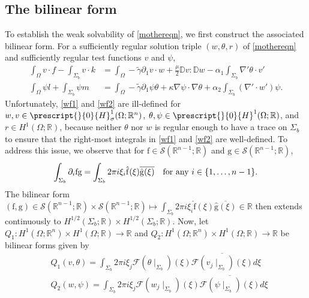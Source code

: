 \documentclass[11pt,letterpaper,reqno]{amsart}
\numberwithin{equation}{section}
\begin{document}
\subsection{The bilinear form} \label{blform}

To establish the weak solvability of \eqref{mothereqn}, we first construct the associated bilinear form. For a sufficiently regular solution triple \((w, \theta, r)\) of \eqref{mothereqn} and sufficiently regular test functions \(v\) and \(\psi\),
\begin{align}
    \int_{\Omega}v\cdot f-\int_{\Sigma_{b}} v \cdot k &= \int_{\Omega}-\widetilde{\gamma} \partial_{1}v \cdot w +\frac{\mu}{2}\mathbb{D}v:\mathbb{D}w-\alpha_{1}\int_{\Sigma_{b}}\nabla' \theta \cdot v' \label{wf1} \\
    \int_{\Omega}\psi l +\int_{\Sigma_{b}}\psi m &=\int_{\Omega}-\widetilde{\gamma}\partial_{1}\psi \theta+\kappa \nabla\psi \cdot \nabla \theta +\alpha_{2}\int_{\Sigma_{b}} (\nabla' \cdot w') \psi. \label{wf2}
\end{align}
Unfortunately, \eqref{wf1} and \eqref{wf2} are ill-defined for \(w,v \in \prescript{}{0}{H}^{1}_{\sigma}(\Omega;\mathbb{R}^{n})\), \(\theta,\psi \in \prescript{}{0}{H}^{1}(\Omega;\mathbb{R})\), and \(r \in H^{1}(\Omega;\mathbb{R})\), because neither \(\theta\) nor \(w\) is regular enough to have a trace on \(\Sigma_{b}\) to ensure that the right-most integrals in \eqref{wf1} and \eqref{wf2} are well-defined. To address this issue, we observe that for \(\mathrm{f}\in\mathscr{S}(\mathbb{R}^{n-1};\mathbb{R})\) and \(\mathrm{g}\in\mathscr{S}(\mathbb{R}^{n-1};\mathbb{R})\),
\begin{align}
    \int_{\Sigma_{b}}\partial_{i}\mathrm{f}\mathrm{g}=\int_{\Sigma_{b}}2\pi i \xi_{i}\hat{\mathrm{f}}(\xi)\overline{\hat{\mathrm{g}}(\xi)} \mbox{\quad for any \(i \in \{1, \dots, n-1\}\)}.
\end{align}
The bilinear form \((\mathrm{f},\mathrm{g}) \in \mathscr{S}(\mathbb{R}^{n-1};\mathbb{R}) \times \mathscr{S}(\mathbb{R}^{n-1};\mathbb{R}) \mapsto \int_{\Sigma_{b}}2\pi i \xi_{i}\hat{\mathrm{f}}(\xi)\overline{\hat{\mathrm{g}}(\xi)} \in \mathbb{R}\) then extends continuously to \(H^{1/2}(\Sigma_{b};\mathbb{R}) \times H^{1/2}(\Sigma_{b};\mathbb{R})\). Now, let \(Q_{1}: H^{1}(\Omega;\mathbb{R}^{n}) \times H^{1}(\Omega;\mathbb{R}) \to \mathbb{R}\) and \(Q_{2}: H^{1}(\Omega;\mathbb{R}^{n}) \times H^{1}(\Omega;\mathbb{R}) \to \mathbb{R}\) be bilinear forms given by 
\begin{align}
    &Q_{1}(v,\theta)=\int_{\Sigma_{b}}2\pi i\xi_{j}\mathcal{F}(\theta \mid_{\Sigma_{b}})(\xi)\overline{\mathcal{F}(v_{j}\mid_{\Sigma_{b}})(\xi)} d \xi \label{Q1} \\
    &Q_{2}(w,\psi)=\int_{\Sigma_{b}}2\pi i \xi_{j}\mathcal{F}(w_{j}\mid_{\Sigma_{b}})(\xi)\overline{\mathcal{F}(\psi\mid_{\Sigma_{b}})(\xi)}  d\xi \label{Q2}
\end{align}
\end{document}

